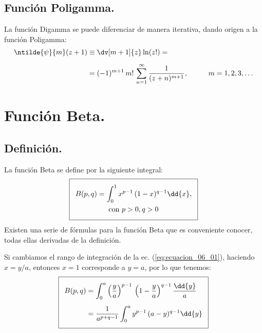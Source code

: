 \subsection{Función Poligamma.}

La función Digamma se puede diferenciar de manera iterativa, dando origen a la función Poligamma:
\begin{align}
\begin{aligned}
\ntilde{\psi}{m} (z + 1) &\equiv \dv[m+1]{z} \ln(z!) = \\[0.5em]
&= (-1)^{m+1} \, m! \,\sum_{n=1}^{\infty} \dfrac{1}{(z + n)^{m+1}}, \hspace{1cm} m = 1, 2, 3, \ldots
\end{aligned}
\label{eq:ecuacion_10_41}
\end{align}

\section{Función Beta.}

\subsection{Definición.}

La función Beta se define por la siguiente integral:
\begin{align} \addtolength{\fboxsep}{5pt}\boxed{
\begin{gathered}
B(p, q) = \int_{0}^{1} x^{p-1} \, (1- x )^{q-1} \dd{x}, \\
\mbox{con }  p > 0, q > 0
\end{gathered}}
\label{eq:ecuacion_06_01}
\end{align}
Existen una serie de fórmulas para la función Beta que es conveniente conocer, todas ellas derivadas de la definición.
\par
Si cambiamos el rango de integración de la ec. (\ref{eq:ecuacion_06_01}), haciendo $x = y/a$, entonces $x = 1$ corresponde a $y = a$, por lo que tenemos:
\begin{align} \addtolength{\fboxsep}{5pt}\boxed{
\begin{aligned}
B (p, q) &= \int_{0}^{a} \left( \dfrac{y}{a}\right)^{p-1} \, \left( 1 - \dfrac{y}{a}\right)^{q-1} \dfrac{\dd{y}}{a} \\[0.5em]
&= \dfrac{1}{a^{p+q-1}} \int_{0}^{a} y^{p-1} \, (a - y)^{q-1} \dd{y}
\end{aligned}
\label{eq:ecuacion_06_03}
}
\end{align}

